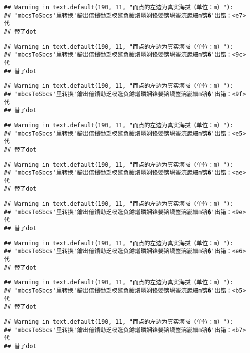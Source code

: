 \documentclass[
]{article}
\begin{document}
\begin{verbatim}
## Warning in text.default(190, 11, "而点的左边为真实海拔（单位：m）"):
## 'mbcsToSbcs'里转换'鑰岀偣鐨勫乏杈逛负鐪熷疄娴锋嫈锛堝崟浣嶏細m锛�'出错：<e7>代
## 替了dot
\end{verbatim}

\begin{verbatim}
## Warning in text.default(190, 11, "而点的左边为真实海拔（单位：m）"):
## 'mbcsToSbcs'里转换'鑰岀偣鐨勫乏杈逛负鐪熷疄娴锋嫈锛堝崟浣嶏細m锛�'出错：<9c>代
## 替了dot
\end{verbatim}

\begin{verbatim}
## Warning in text.default(190, 11, "而点的左边为真实海拔（单位：m）"):
## 'mbcsToSbcs'里转换'鑰岀偣鐨勫乏杈逛负鐪熷疄娴锋嫈锛堝崟浣嶏細m锛�'出错：<9f>代
## 替了dot
\end{verbatim}

\begin{verbatim}
## Warning in text.default(190, 11, "而点的左边为真实海拔（单位：m）"):
## 'mbcsToSbcs'里转换'鑰岀偣鐨勫乏杈逛负鐪熷疄娴锋嫈锛堝崟浣嶏細m锛�'出错：<e5>代
## 替了dot
\end{verbatim}

\begin{verbatim}
## Warning in text.default(190, 11, "而点的左边为真实海拔（单位：m）"):
## 'mbcsToSbcs'里转换'鑰岀偣鐨勫乏杈逛负鐪熷疄娴锋嫈锛堝崟浣嶏細m锛�'出错：<ae>代
## 替了dot
\end{verbatim}

\begin{verbatim}
## Warning in text.default(190, 11, "而点的左边为真实海拔（单位：m）"):
## 'mbcsToSbcs'里转换'鑰岀偣鐨勫乏杈逛负鐪熷疄娴锋嫈锛堝崟浣嶏細m锛�'出错：<9e>代
## 替了dot
\end{verbatim}

\begin{verbatim}
## Warning in text.default(190, 11, "而点的左边为真实海拔（单位：m）"):
## 'mbcsToSbcs'里转换'鑰岀偣鐨勫乏杈逛负鐪熷疄娴锋嫈锛堝崟浣嶏細m锛�'出错：<e6>代
## 替了dot
\end{verbatim}

\begin{verbatim}
## Warning in text.default(190, 11, "而点的左边为真实海拔（单位：m）"):
## 'mbcsToSbcs'里转换'鑰岀偣鐨勫乏杈逛负鐪熷疄娴锋嫈锛堝崟浣嶏細m锛�'出错：<b5>代
## 替了dot
\end{verbatim}

\begin{verbatim}
## Warning in text.default(190, 11, "而点的左边为真实海拔（单位：m）"):
## 'mbcsToSbcs'里转换'鑰岀偣鐨勫乏杈逛负鐪熷疄娴锋嫈锛堝崟浣嶏細m锛�'出错：<b7>代
## 替了dot
\end{verbatim}
\end{document}
